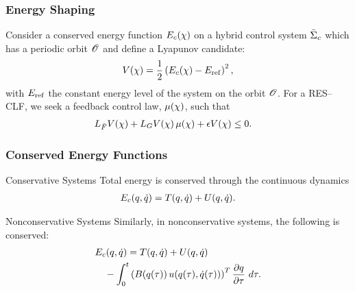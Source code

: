 \begin{frame}[t]
  \frametitle{Energy Shaping}
  Consider a conserved energy function $E_{c}(\chi)$ on a hybrid control system
  $\bar{\Sigma}_{c}$ which has a periodic orbit $\mathscr O$ and define a Lyapunov candidate:
  \begin{align*}
    V(\chi) = \frac{1}{2} \left(E_{c}(\chi) - E_{\mathrm{ref}}\right)^{2},
  \end{align*}
  with $E_{\mathrm{ref}}$ the constant energy level of the system on the orbit
  $\mathscr O$. For a RES--CLF, we seek a feedback control law, $\mu(\chi)$, such that
  \begin{align*}
    L_{{\bar {F}}} V(\chi) + L_{G} V(\chi) \, \mu(\chi) + \epsilon V(\chi) &\leq 0.
  \end{align*}
\end{frame}

\begin{frame}[t]
  \frametitle{Conserved Energy Functions}
   {
    \begin{block}{Conservative Systems}
      Total energy is conserved through the continuous dynamics
      \begin{align*}
        E_{c}(q, \dot q) = T(q, \dot q) + U(q, \dot q).
      \end{align*}
    \end{block}
    \begin{block}{Nonconservative Systems}
      Similarly, in nonconservative systems, the following is conserved:
      \begin{align*}
        \lefteqn{\Ec\argsqdq = T\argsqdq + U\argsqdq}\\
        &&\mbox{}- \int_{0}^{t} \left( \B\argsqtau \,
          \uu\argsqdqtau \right)^{T} \pd{\q}{\tau} \ d\tau.
      \end{align*}
    \end{block}
  }


\end{frame}
